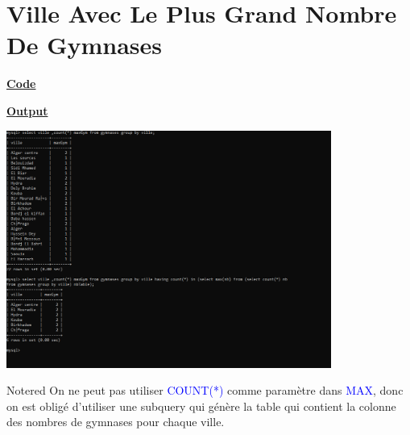 \newpage

\section{Ville Avec Le Plus Grand Nombre De Gymnases}

\textbf{\underline{Code}}


\vspace{0.5cm}
\textbf{\underline{Output}}

\vspace{0.25cm}
\begin{center}
    \includegraphics[width=0.8\textwidth]{Parties/Partie3/nbgym.PNG}
\end{center}

\vspace{0.5cm}

\begin{prettyBox}{Note}{red}
On ne peut pas utiliser \textcolor{blue}{COUNT(*)} comme paramètre dans \textcolor{blue}{MAX},  
donc on est obligé d'utiliser une subquery qui génère la table qui contient la colonne des  
nombres de gymnases pour chaque ville.
\end{prettyBox}

